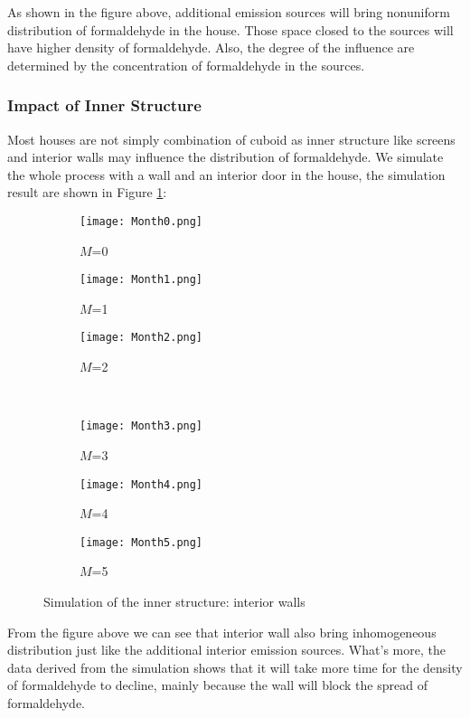 \documentclass{mcmthesis}
\begin{document}
As shown in the figure above, additional emission sources will bring nonuniform distribution of formaldehyde in the house. Those space closed to the sources will have higher density of formaldehyde. Also, the degree of the influence are determined by the concentration of formaldehyde in the sources.



\subsubsection{Impact of Inner Structure}

Most houses are not simply combination of cuboid as inner structure like screens and interior walls may influence the distribution of formaldehyde. We simulate the whole process with a wall and an interior door in the house, the simulation result are shown in Figure \ref{fig:wall}:

\begin{figure}[H]
  \centering
  \begin{subfigure}[b]{0.3\linewidth}
    \texttt{[image: Month0.png]}
    \caption{$M$=0}
  \end{subfigure}
  \begin{subfigure}[b]{0.3\linewidth}
    \texttt{[image: Month1.png]}
    \caption{$M$=1}
  \end{subfigure}
  \begin{subfigure}[b]{0.3\linewidth}
    \texttt{[image: Month2.png]}
    \caption{$M$=2}
  \end{subfigure}\\
  \begin{subfigure}[b]{0.3\linewidth}
    \texttt{[image: Month3.png]}
    \caption{$M$=3}
  \end{subfigure}
  \begin{subfigure}[b]{0.3\linewidth}
    \texttt{[image: Month4.png]}
    \caption{$M$=4}
  \end{subfigure}
  \begin{subfigure}[b]{0.3\linewidth}
    \texttt{[image: Month5.png]}
    \caption{$M$=5}
  \end{subfigure}
  \caption{Simulation of the inner structure: interior walls}
  \label{fig:wall}
\end{figure}


From the figure above we can see that interior wall also bring inhomogeneous distribution just like the additional interior emission sources. What's more, the data derived from the simulation shows that it will take more time for the density of formaldehyde to decline, mainly because the wall will block the spread of formaldehyde.
\end{document}
